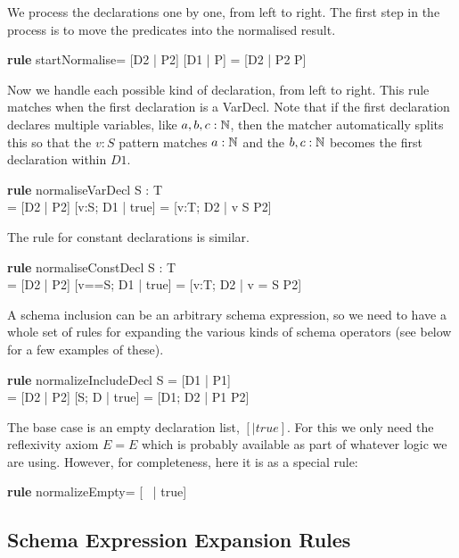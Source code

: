 \documentclass{article}
\newenvironment{zedrule}[1]{\par\textbf{rule }#1\vspace{-2ex}\infrule}{\endinfrule}
\newcommand{\derives}{\derive{}}
\newcommand{\proviso}{\raisebox{0.5ex}{${}_{\blacktriangleright}\ $}}%
\begin{document}
We process the declarations one by one, from left to right.
The first step in the process is to move the predicates into
the normalised result.
\begin{zedrule}{startNormalise}
   [D1 | true] = [D2 | P2]
\derives
   [D1 | P] = [D2 | P2 \land P]
\end{zedrule}

Now we handle each possible kind of declaration, from left to right.
This rule matches when the first declaration is a VarDecl.
Note that if the first declaration declares multiple variables,
like $a,b,c:{\mathbb N}$, then the matcher automatically splits this
so that the $v:S$ pattern matches $a:{\mathbb N}$ and the $b,c:{\mathbb N}$
becomes the first declaration within $D1$.
\begin{zedrule}{normaliseVarDecl}
   \proviso S : \power T \\
   [D1 | true] = [D2 | P2]
\derives
   [v:S; D1 | true] = [v:T; D2 | v \in S \land P2]
\end{zedrule}

The rule for constant declarations is similar.
\begin{zedrule}{normaliseConstDecl}
   \proviso S : \power T \\
   [D1 | true] = [D2 | P2]
\derives
   [v==S; D1 | true] = [v:\power T; D2 | v = S \land P2]
\end{zedrule}

A schema inclusion can be an arbitrary schema expression,
so we need to have a whole set of rules for expanding
the various kinds of schema operators (see below for a 
few examples of these).
\begin{zedrule}{normalizeIncludeDecl}
   S = [D1 | P1] \\
   [D | true] = [D2 | P2]
\derives
   [S; D | true] = [D1; D2 | P1 \land P2]
\end{zedrule}

The base case is an empty declaration list, $[|true]$.
For this we only need the reflexivity axiom $E=E$ which
is probably available as part of whatever logic we are
using.  However, for completeness, here it is as a special rule:
\begin{zedrule}{normalizeEmpty}
   [~ | true] = [~ | true]
\end{zedrule}


\subsection{Schema Expression Expansion Rules}
\end{document}
